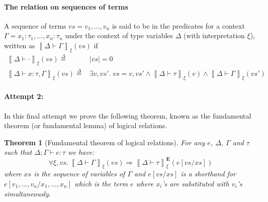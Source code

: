 \documentclass{article}
\newtheorem{theorem}{Theorem}
\newcommand{\defeq}{\overset{\Delta}{=}}
\newcommand{\semtyp}[3]{\left\llbracket #2 \vdash #3 \right\rrbracket_{#1}}
\newcommand{\semErel}[1]{#1^{\textbf{E}}}
\newcommand{\semenv}{\xi}
\newcommand{\Tctx}{\Gamma}
\newcommand{\CtxTps}{\Delta}
\newcommand{\expr}{e}
\newcommand{\val}{v}
\newcommand{\var}{x}
\newcommand{\typ}{\tau}
\newcommand{\typed}[4]{#1; #2 \vdash #3 : #4}
\begin{document}
\paragraph{The relation on sequences of terms}
A sequence of terms $\mathit{vs} = \val_1, \dots,\val_n$ is said to be in the predicates for a context $\Tctx = \var_1 : \typ_1,\dots, \var_n : \typ_n$ under the context of type variables $\CtxTps$ (with interpretation $\semenv$), written as $\semtyp{\semenv}{\CtxTps}{\Tctx}(vs)$ if
\begin{align*}
\semtyp{\semenv}{\CtxTps}{\cdot}(\mathit{vs}) \defeq{}& |\mathit{vs}| = 0\\
\semtyp{\semenv}{\CtxTps}{\var : \typ, \Tctx}(\mathit{vs}) \defeq{}& \exists \val, \mathit{vs'}.\; \mathit{vs} = \val, \mathit{vs'} \land \semtyp{\semenv}{\CtxTps}{\typ}(\val) \land \semtyp{\semenv}{\CtxTps}{\Tctx}(\mathit{vs'})
\end{align*}

\paragraph{Attempt 2:} In this final attempt we prove the following theorem, known as the fundamental theorem (or fundamental lemma) of logical relations.

\begin{theorem}[Fundamental theorem of logical relations]
For any $e$, $\CtxTps$, $\Tctx$ and $\typ$ such that $\typed{\CtxTps}{\Tctx}{\expr}{\typ}$ we have:
\[
\forall \semenv, \mathit{vs}. ~\semtyp{\semenv}{\CtxTps}{\Tctx}(\mathit{vs}) \Rightarrow
\semErel{\semtyp{\semenv}{\CtxTps}{\typ}}(\expr[\mathit{vs}/\mathit{xs}])
\]
where $\mathit{xs}$ is the sequence of variables of $\Tctx$ and $\expr[\mathit{vs}/\mathit{xs}]$ is a shorthand for $\expr[\val_1, \dots, \val_n/\var_1, \dots, \var_n]$ which is the term $\expr$ where $\var_i$'s are substituted with $\val_i$'s simultaneously.
\end{theorem}
\end{document}
